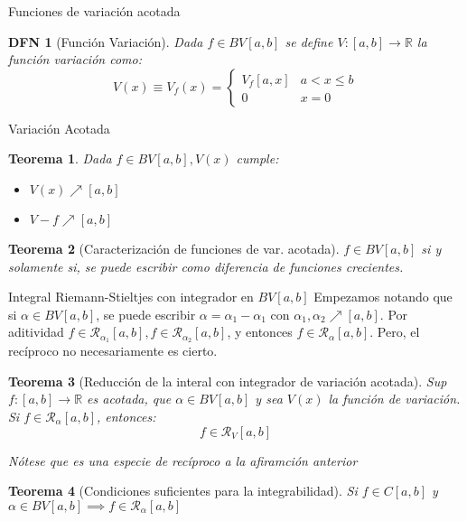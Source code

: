 \documentclass[a4paper]{article}\usepackage{/home/alonso/Documents/Projects/formularios/styles}
\newtheorem{definition}{DFN}
\theoremstyle{mytheoremstyle}
\newtheorem{theorem}{Teorema}
\newcommand{\R}{\mathbb{R}}
\newcommand{\1}{\mathds{1}}
\begin{document}
\begin{multicols*}{3}
\begin{roundbox}{Funciones de variación acotada}
	\begin{definition}[Función Variación]
		Dada $ f \in BV[a,b] $ se define $ V : [a,b] \to \R $ la función variación como:
		\[
			V(x) \equiv V_f(x) =
			\begin{cases}
				V_f [a,x] & a< x \leq b \\
				0 & x=0
			\end{cases}
		\]
	\end{definition}
\end{roundbox}

\pagebreak

\begin{roundbox}{Variación Acotada}
	\begin{theorem}
		Dada $ f \in BV[a,b], V(x) $ cumple:
		\begin{itemize}
			\item $ V(x) \nearrow [a,b] $
			\item $ V -f \nearrow [a,b]$
		\end{itemize}
	\end{theorem}

	\begin{theorem}[Caracterización de funciones de var. acotada]
		$ f \in BV[a,b]$ si y solamente si, se puede escribir como diferencia de funciones crecientes.
	\end{theorem}
\end{roundbox}

\begin{roundbox}{Integral Riemann-Stieltjes con integrador en $BV[a,b] $}
	Empezamos notando que si $ \alpha \in BV[a,b] $, se puede escribir $ \alpha = \alpha_1 - \alpha_1 $ con $ \alpha_1, \alpha_2 \nearrow [a,b] $.
	Por aditividad $ f \in \mathcal{R}_{\alpha_1} [a,b], f \in \mathcal{R}_{\alpha_2} [a,b]$, y entonces $ f \in \mathcal{R}_{\alpha} [a,b]$.
	Pero, el recíproco no necesariamente es cierto.

	\begin{theorem}[Reducción de la interal con integrador de variación acotada]
		Sup $  f : [a,b] \to \R $ es acotada, que $  \alpha \in BV[a,b] $ y sea $ V(x) $ la función de variación.
		Si $ f \in \mathcal{R}_{\alpha} [a,b] $, entonces:
		\[
			f \in \mathcal{R}_{V} [a,b]
		\]

		Nótese que es una especie de recíproco a la afiramción anterior
	\end{theorem}

	\begin{theorem}[Condiciones suficientes para la integrabilidad]
		Si $ f \in C[a,b] $ y $ \alpha \in BV[a,b] \implies f \in \mathcal{R}_{\alpha} [a,b] $
	\end{theorem}


\end{roundbox}
\end{multicols*}
\end{document}
